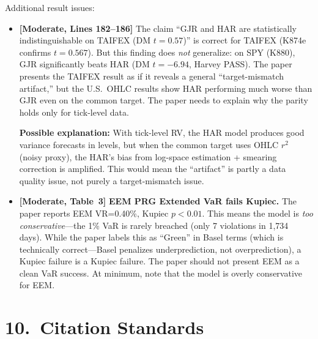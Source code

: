 \documentclass[12pt,a4paper]{article}
\begin{document}
\noindent \textcolor{warncolor}{Additional result issues:}
\begin{itemize}[nosep]
\item [\textcolor{warncolor}{M11}] \textbf{[Moderate, Lines 182--186]} The claim ``GJR and HAR are statistically indistinguishable on TAIFEX (DM $t=0.57$)'' is correct for TAIFEX (K874e confirms $t=0.567$). But this finding does \emph{not} generalize: on SPY (K880), GJR significantly beats HAR (DM $t=-6.94$, Harvey PASS). The paper presents the TAIFEX result as if it reveals a general ``target-mismatch artifact,'' but the U.S.\ OHLC results show HAR performing much worse than GJR even on the common target. The paper needs to explain why the parity holds only for tick-level data.

  \textbf{Possible explanation:} With tick-level RV, the HAR model produces good variance forecasts in levels, but when the common target uses OHLC $r^2$ (noisy proxy), the HAR's bias from log-space estimation + smearing correction is amplified. This would mean the ``artifact'' is partly a data quality issue, not purely a target-mismatch issue.

\item [\textcolor{warncolor}{M12}] \textbf{[Moderate, Table~3]} \textbf{EEM PRG Extended VaR fails Kupiec.} The paper reports EEM VR=0.40\%, Kupiec $p<0.01$. This means the model is \emph{too conservative}---the 1\% VaR is rarely breached (only 7 violations in 1,734 days). While the paper labels this as ``Green'' in Basel terms (which is technically correct---Basel penalizes underprediction, not overprediction), a Kupiec failure is a Kupiec failure. The paper should not present EEM as a clean VaR success. At minimum, note that the model is overly conservative for EEM.
\end{itemize}

\bigskip

\section*{10.\ Citation Standards}
\end{document}
